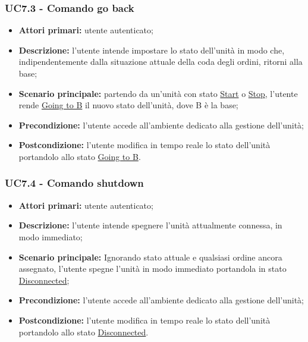         \subsubsection{UC7.3 - Comando go back}
        \begin{itemize}
            \item \textbf{Attori primari:} utente autenticato;
            \item \textbf{Descrizione:} l'utente intende impostare lo stato dell'unità in modo che, indipendentemente dalla situazione attuale della coda degli ordini, ritorni alla base;
            \item \textbf{Scenario principale:} partendo da un'unità con stato \underline{Start} o \underline{Stop}, l'utente rende \underline{Going to B} il nuovo stato dell'unità, dove B è la base;
            \item \textbf{Precondizione:} l'utente accede all'ambiente dedicato alla gestione dell'unità;
            \item \textbf{Postcondizione:} l'utente modifica in tempo reale lo stato dell'unità portandolo allo stato \underline{Going to B}.
        \end{itemize}

        \subsubsection{UC7.4 - Comando shutdown}
        \begin{itemize}
            \item \textbf{Attori primari:} utente autenticato;
            \item \textbf{Descrizione:} l'utente intende spegnere l'unità attualmente connessa, in modo immediato;
            \item \textbf{Scenario principale:} Ignorando stato attuale e qualsiasi ordine ancora assegnato, l'utente spegne l'unità in modo immediato portandola in stato \underline{Disconnected};
            \item \textbf{Precondizione:} l'utente accede all'ambiente dedicato alla gestione dell'unità;
            \item \textbf{Postcondizione:} l'utente modifica in tempo reale lo stato dell'unità portandolo allo stato \underline{Disconnected}.
        \end{itemize}

